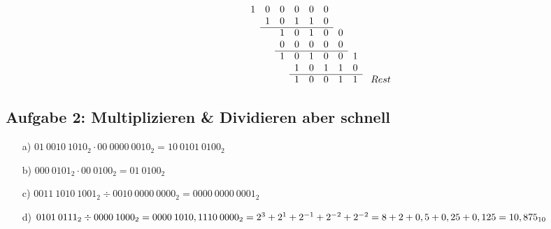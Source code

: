 \documentclass{article}
\begin{document}
\begin{itemize}
\[\begin{array}{*{14}{l}}
       	  &   &   & 1 & 0 & 0 & 0 & 0 & 0 &   &   &                  \\
       	  &   &   &   & 1 & 0 & 1 & 1 & 0 &   &   &                  \\ \cline{5-9}
       	  &   &   &   &   & 1 & 0 & 1 & 0 & 0 &   &                  \\
       	  &   &   &   &   & 0 & 0 & 0 & 0 & 0 &   &                  \\ \cline{6-10}
       	  &   &   &   &   & 1 & 0 & 1 & 0 & 0 & 1 &                  \\
       	  &   &   &   &   &   & 1 & 0 & 1 & 1 & 0 &                  \\ \cline{7-11}
       	  &   &   &   &   &   & 1 & 0 & 0 & 1 & 1 & \ Rest
       \end{array}
       \]
    \end{itemize}


    \subsection*{Aufgabe 2: Multiplizieren \& Dividieren aber schnell}
    \begin{enumerate}
        \item[a)]$01\:0010\:1010_2\cdot 00\:0000\:0010_2=10\:0101\:0100_2$
        \item[b)]$000\:0101_2\cdot 00\:0100_2=01\:0100_2$
        \item[c)]$0011\:1010\:1001_2\div 0010\:0000\:0000_2=0000\:0000\:0001_2$
        \item[d)]$0101\:0111_2\div 0000\:1000_2=0000\:1010,1110\:0000_2 = \\2^3+2^1+2^{-1}+2^{-2}+2^{-2} = 8+2+0,5+0,25+0,125=10,875_{10}$
    \end{enumerate}
\end{document}
